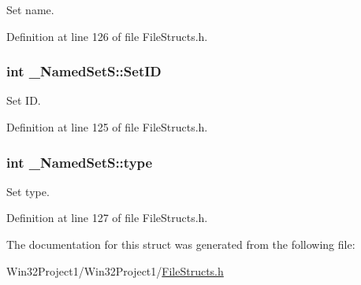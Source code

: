 Set name. 



Definition at line 126 of file File\+Structs.\+h.

\subsubsection[{\texorpdfstring{Set\+ID}{SetID}}]{\setlength{\rightskip}{0pt plus 5cm}int \+\_\+\+Named\+Set\+S\+::\+Set\+ID}\hypertarget{struct___named_set_s_a91887154f85a9738aa1d7c313bc3ca3a}{}\label{struct___named_set_s_a91887154f85a9738aa1d7c313bc3ca3a}


Set ID. 



Definition at line 125 of file File\+Structs.\+h.

\subsubsection[{\texorpdfstring{type}{type}}]{\setlength{\rightskip}{0pt plus 5cm}int \+\_\+\+Named\+Set\+S\+::type}\hypertarget{struct___named_set_s_a4f6ea227fa28a50d54f8ae8bca7f6a17}{}\label{struct___named_set_s_a4f6ea227fa28a50d54f8ae8bca7f6a17}


Set type. 



Definition at line 127 of file File\+Structs.\+h.



The documentation for this struct was generated from the following file\+:\begin{DoxyCompactItemize}
\item 
Win32\+Project1/\+Win32\+Project1/\hyperlink{_file_structs_8h}{File\+Structs.\+h}\end{DoxyCompactItemize}
